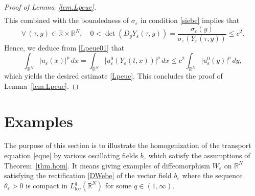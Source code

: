 \documentclass[JEP,XML,SOM,Unicode]{cedram}
\newcommand{\loc}{\mathrm{loc}}
\def \RR {\mathbb R}
\theoremstyle{plain}
\theoremstyle{definition}
\begin{document}
\begin{proof}[Proof of Lemma~\ref{lem.Lpeue}]
\begin{multline*}
\end{multline*}
This combined with the boundedness of $\sigma_\varepsilon$ in condition \eqref{siebe} implies that
\[
\forall\,(\tau,y)\in\RR\times\RR^N,\quad 0<\det(D_y Y_\varepsilon(\tau,y))= \dfrac{\sigma_\varepsilon(y)}{\sigma_\varepsilon(Y_\varepsilon(\tau,y))}\leq c^2.
\]
Hence, we deduce from \eqref{Lpeue01} that
\[
\int_{\RR^N}|u_\varepsilon(x)|^p\,dx=\int_{\RR^N}\big|u_\varepsilon^0(Y_\varepsilon(t,x))\big|^p\,dx\leq c^2\int_{\RR^N}\big|u_\varepsilon^0(y)\big|^p\,dy,
\]
which yields the desired estimate \eqref{Lpeue}. This concludes the proof of Lemma~\ref{lem.Lpeue}.
\end{proof}


\section{Examples}\label{s.exa}
The purpose of this section is to illustrate the homogenization of the transport equation \eqref{eque} by various oscillating fields $b_\varepsilon$ which satisfy the assumptions of Theorem~\ref{thm.hom}. It means giving examples of diffeomorphism $W_\varepsilon$ on $\RR^N$ satisfying the rectification \eqref{DWebe} of the vector field $b_\varepsilon$ where the sequence $\theta_\varepsilon>0$ is compact in $L^q_\loc(\RR^N)$ for some $q\in(1,\infty)$.
\end{document}
